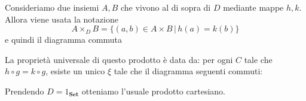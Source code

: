 \documentclass[a4paper]{article}
\begin{document}
Consideriamo due insiemi \(A,B\) che vivono al di sopra di \(D\)
mediante mappe \(h,k\). Allora viene usata la notazione
\[
    A \times_D B = \{(a,b) \in A\times B \,|\, h(a) = k(b)\}
\]
e quindi il diagramma commuta
La proprietà universale di questo prodotto è data da: per ogni \(C\)
tale che \(h\circ g = k \circ g\), esiste un unico \(\xi\)
tale che il diagramma seguenti commuti:
\begin{center}
\end{center}

Prendendo \(D = 1_\mathbf{Set}\) otteniamo l'usuale prodotto cartesiano.
\end{document}
